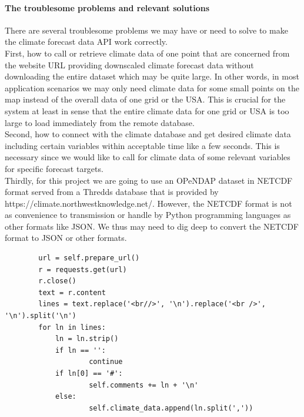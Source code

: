 \documentclass[onecolumn, draftclsnofoot,10pt, compsoc]{article}
\begin{document}
		\paragraph{The troublesome problems and relevant solutions} \hfill \break
		There are several troublesome problems we may have or need to solve to make the climate forecast data API work correctly. \\
		First, how to call or retrieve climate data of one point that are concerned from the website URL providing downscaled climate forecast data without downloading the entire dataset which may be quite large. In other words, in most application scenarios we may only need climate data for some small points on the map instead of the overall data of one grid or the USA. This is crucial for the system at least in sense that the entire climate data for one grid or USA is too large to load immediately from the remote database.\\
		Second, how to connect with the climate database and get desired climate data including certain variables within acceptable time like a few seconds. This is necessary since we would like to call for climate data of some relevant variables for specific forecast targets.\\
		Thirdly, for this project we are going to use an OPeNDAP dataset in NETCDF format served from a Thredds database that is provided by https://climate.northwestknowledge.net/. However, the NETCDF format is not as convenience to transmission or handle by Python programming languages as other formats like JSON. We thus may need to dig deep to convert the NETCDF format to JSON or other formats.\\

		\begin{lstlisting}
		url = self.prepare_url()
		r = requests.get(url)
		r.close()
		text = r.content
		lines = text.replace('<br//>', '\n').replace('<br />', '\n').split('\n')
		for ln in lines:
			ln = ln.strip()
			if ln == '':
					continue
			if ln[0] == '#':
					self.comments += ln + '\n'
			else:
					self.climate_data.append(ln.split(','))
		\end{lstlisting}
\end{document}
